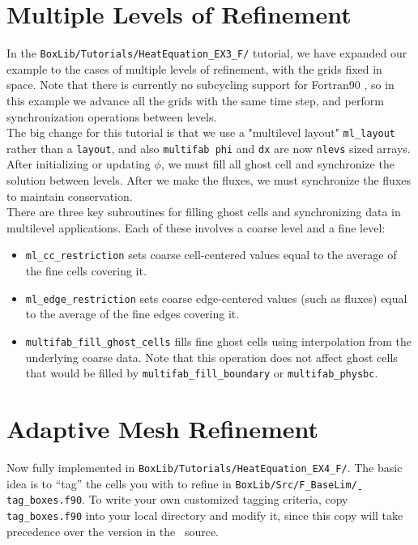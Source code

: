 \section{Multiple Levels of Refinement}\label{Sec:Refinement}
In the {\tt BoxLib/Tutorials/HeatEquation\_EX3\_F/} tutorial, we have expanded our example
to the cases of multiple levels of refinement, with the grids fixed in space.  Note that there is
currently no subcycling support for Fortran90 \BoxLib, so in this example we advance all the grids
with the same time step, and perform synchronization operations between levels.\\

The big change for this tutorial is that we use a "multilevel layout" {\tt ml\_layout} 
rather than a {\tt layout}, and also {\tt multifab phi} and {\tt dx} are now {\tt nlevs} sized arrays.
After initializing or updating $\phi$, we must fill all ghost cell and synchronize the solution between
levels.  After we make the fluxes, we must synchronize the fluxes to maintain conservation.\\

There are three key subroutines for filling ghost cells and synchronizing data in multilevel applications.
Each of these involves a coarse level and a fine level:
\begin{itemize}

\item {\tt ml\_cc\_restriction} sets coarse cell-centered values equal to the average of the fine
  cells covering it.

\item {\tt ml\_edge\_restriction} sets coarse edge-centered values (such as fluxes) equal to the average
  of the fine edges covering it.

\item {\tt multifab\_fill\_ghost\_cells} fills fine ghost cells using interpolation from the underlying coarse
  data.  Note that this operation does not affect ghost cells that would be filled by {\tt multifab\_fill\_boundary}
  or {\tt multifab\_physbc}.

\end{itemize}

\section{Adaptive Mesh Refinement}\label{Sec:AMR}
Now fully implemented in {\tt BoxLib/Tutorials/HeatEquation\_EX4\_F/}.  The basic idea is
to ``tag'' the cells you with to refine in {\tt BoxLib/Src/F\_BaseLim\b/tag\_boxes.f90}.  To write
your own customized tagging criteria, copy {\tt tag\_boxes.f90} into your local directory and modify
it, since this copy will take precedence over the version in the \BoxLib~source.


